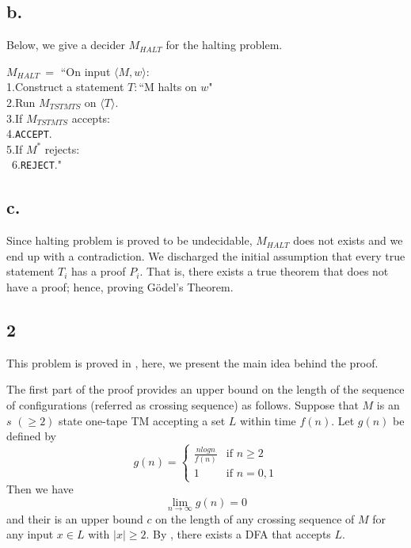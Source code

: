 \documentclass[12pt]{article}
\begin{document}
\subsection*{b.}

Below, we give a decider $M_{HALT}$ for the halting problem.

\noindent
$M_{HALT} \ =$ ``On input $\langle M, w\rangle$:\\
	1.\indent\indent Construct a statement $T:$``M halts on $w$"\\
	2.\indent\indent Run $M_{TSTMTS}$ on $\langle T \rangle$.\\
	3.\indent\indent\indent\indent If $M_{TSTMTS}$ accepts:\\
	4.\indent\indent\indent\indent\indent\indent \texttt{ACCEPT}.\\
	5.\indent\indent\indent\indent If $M^*$ rejects:\\\
	6.\indent\indent\indent\indent\indent\indent \texttt{REJECT}."\\

\subsection*{c.}

Since halting problem is proved to be undecidable, $M_{HALT}$ does not exists and we end up with a contradiction. We discharged the initial assumption that every true statement $T_i$ has a proof $P_i$. That is, there exists a true theorem that does not have a proof; hence, proving G\"odel's Theorem.

\subsection*{2}

This problem is proved in \cite{a}, here, we present the main idea behind the proof.

The first part of the proof provides an upper bound on the length of the sequence of configurations (referred as crossing sequence) as follows. Suppose that $M$ is an $s$ $(\geq 2)$ state one-tape TM accepting a set $L$ within time $f(n)$. Let $g(n)$ be defined by
\[
 	g(n) = \begin{cases} 
  	 \frac{nlogn}{f(n)} & \text{if } n \geq 2 \\
  	 1       & \text{if } n = 0, 1
  	\end{cases}
\]
Then we have 
\[
 	\lim_{n \rightarrow \infty} g(n) = 0
\]
and their is an upper bound $c$ on the length of any crossing sequence of $M$ for any input $x \in L$ with $|x| \geq 2$. By \cite{b}, there exists a DFA that accepts $L$.
\end{document}
